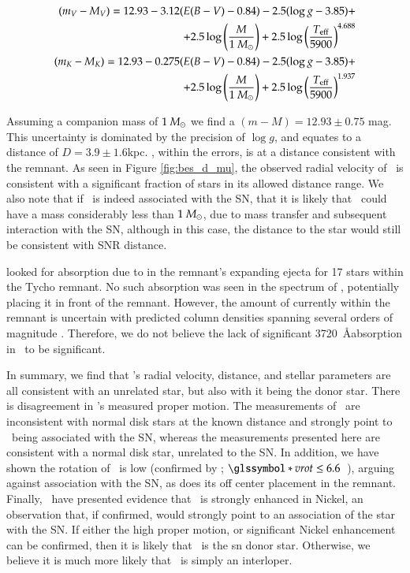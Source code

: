 \begin{eqnarray}
(m_V-M_V)=12.93-3.12(E(B-V)-0.84)-2.5 (\log{g} -3.85)+\\
+2.5\log\left(\frac{M}{1~\hbox{$M_{\odot}$} }\right)+2.5\log\left( \frac{T_{\rm{eff}}}{5900} \right)^{4.688} \nonumber\\
\label{distmodv}
(m_K-M_K)=12.93-0.275(E(B-V)-0.84)-2.5 (\log{g} - 3.85)+\\
+2.5\log\left(\frac{M}{1~\hbox{$M_{\odot}$} }\right)+2.5\log\left( \frac{T_{\rm{eff}}}{5900} \right)^{1.937}\nonumber
\label{distmodk}
\end{eqnarray}

Assuming a companion mass of $1~\hbox{$M_{\odot}$}$ we find a $(m-M)=12.93\pm0.75$ mag. This uncertainty is dominated by the precision of $\log{g}$, and equates to a distance of $D=3.9\pm1.6$kpc. \starg, within the errors, is at a distance consistent with the remnant.  As seen in Figure \ref{fig:bes_d_mu}, the observed radial velocity of \starg\ is consistent with a significant fraction of  stars in its allowed distance range.  We also note that if \starg\ is indeed associated with the SN, that it is likely that \starg\ could have a mass considerably less than $1~\hbox{$M_{\odot}$}$, due to mass transfer and subsequent interaction with the SN, although in this case, the distance to the star would still be consistent with SNR distance. 


\citet{2007PASJ...59..811I} looked for absorption due to  in the remnant's expanding ejecta for 17 stars within the Tycho remnant.  No such absorption was seen in the spectrum of \starg, potentially placing it in front of the remnant. However, the amount of  currently within the remnant is uncertain with predicted column densities spanning several orders of
magnitude \citep[$0.02 - 8.9 \times 10^{15}\rm{~cm}^{-2}$;][]{Hamilton:1988p522,Ozaki:2006p517}. Therefore, we do not believe the lack of significant  3720~\AA absorption in \starg\ to be significant.

In summary, we find that \starg's radial velocity, distance, and stellar parameters are all consistent with an unrelated star, but also with it being the donor star. There is disagreement in  \starg's measured proper motion. The measurements of \rl\ are inconsistent with normal disk stars at the known distance and strongly point to \starg\ being associated with the SN, whereas the measurements presented here are consistent with a normal disk star, unrelated to the SN. In addition, we have shown the rotation of \starg\ is low (confirmed by \gh ; $\vrot \leq 6.6$~\kms  ), arguing against association with the SN, as does its off center placement in the remnant.  Finally, \gh\ have presented evidence that \starg\ is strongly enhanced in Nickel, an observation that, if confirmed, would strongly point to an association of the star with the SN. If either the high proper motion, or significant Nickel enhancement can be confirmed, then it is likely that \starg\ is the \gls*{sn} donor star. Otherwise, we believe it is much more likely that \starg\ is simply an interloper.

